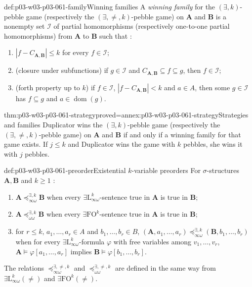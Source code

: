 \begin{hbdefinition}{def:p03-w03-p03-061-family}{Winning families}
A \emph{winning family} for the \((\exists,k)\)-pebble game (respectively the
\((\exists,\neq,k)\)-pebble game) on \(\mathbf A\) and \(\mathbf B\) is a
nonempty set \(\mathcal I\) of partial homomorphisms (respectively one-to-one
partial homomorphisms) from \(\mathbf A\) to \(\mathbf B\) such that
\cite[Def.~8.5, p.~72]{Kolaitis2003ExpressivePowerNotes}:
\begin{enumerate}
\item \(|f-C_{\mathbf A,\mathbf B}|\le k\) for every \(f\in\mathcal I\);
\item (closure under subfunctions) if \(g\in\mathcal I\) and
      \(C_{\mathbf A,\mathbf B}\subseteq f\subseteq g\), then
      \(f\in\mathcal I\);
\item (forth property up to \(k\)) if \(f\in\mathcal I\),
      \(|f-C_{\mathbf A,\mathbf B}|<k\) and \(a\in A\), then some
      \(g\in\mathcal I\) has \(f\subseteq g\) and
      \(a\in\operatorname{dom}(g)\).
\end{enumerate}
\end{hbdefinition}

\begin{hbtheorem}{thm:p03-w03-p03-061-strategy}{proved=annex:p03-w03-p03-061-strategy}{Strategies and families}
Duplicator wins the \((\exists,k)\)-pebble game (respectively the
\((\exists,\neq,k)\)-pebble game) on \(\mathbf A\) and \(\mathbf B\) if and
only if a winning family for that game exists. If \(j\le k\) and Duplicator
wins the game with \(k\) pebbles, she wins it with \(j\) pebbles.
\end{hbtheorem}

\begin{hbdefinition}{def:p03-w03-p03-061-preorder}{Existential \(k\)-variable preorders}
For \(\sigma\)-structures \(\mathbf A,\mathbf B\) and \(k\ge1\)
\cite[Def.~8.6, pp.~72--73]{Kolaitis2003ExpressivePowerNotes}:
\begin{enumerate}
\item \(\mathbf A\preceq^{\exists,k}_{\infty\omega}\mathbf B\) when every
      \(\exists\mathrm L^k_{\infty\omega}\)-sentence true in \(\mathbf A\) is
      true in \(\mathbf B\);
\item \(\mathbf A\preceq^{\exists,k}_{\omega\omega}\mathbf B\) when every
      \(\exists\mathrm{FO}^k\)-sentence true in \(\mathbf A\) is true in
      \(\mathbf B\);
\item for \(r\le k\), \(a_1,\ldots,a_r\in A\) and \(b_1,\ldots,b_r\in B\),
      \((\mathbf A,a_1,\ldots,a_r)\preceq^{\exists,k}_{\infty\omega}
      (\mathbf B,b_1,\ldots,b_r)\) when for every
      \(\exists\mathrm L^k_{\infty\omega}\)-formula \(\varphi\) with free
      variables among \(v_1,\ldots,v_r\),
      \(\mathbf A\models\varphi[a_1,\ldots,a_r]\) implies
      \(\mathbf B\models\varphi[b_1,\ldots,b_r]\).
\end{enumerate}
The relations \(\preceq^{\exists,\neq,k}_{\infty\omega}\) and
\(\preceq^{\exists,\neq,k}_{\omega\omega}\) are defined in the same way from
\(\exists\mathrm L^k_{\infty\omega}(\neq)\) and \(\exists\mathrm{FO}^k(\neq)\).
\end{hbdefinition}

